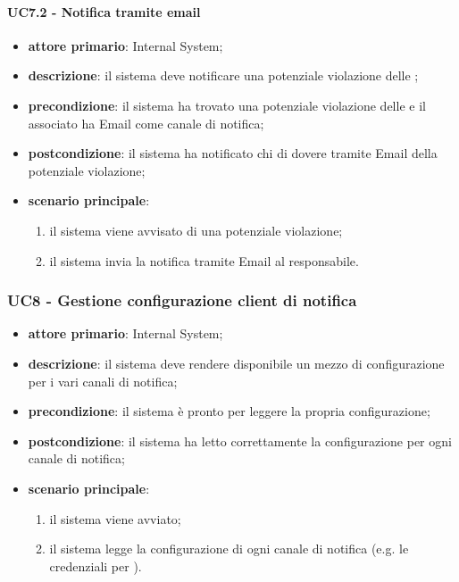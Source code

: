 \paragraph{UC7.2 -  Notifica tramite email}
\begin{itemize}
	\item \textbf{attore primario}: Internal System;
	\item \textbf{descrizione}: il sistema deve notificare una potenziale violazione delle ;
	\item \textbf{precondizione}: il sistema ha trovato una potenziale violazione delle  e il  associato ha Email come canale di notifica;
	\item \textbf{postcondizione}: il sistema ha notificato chi di dovere tramite Email  della potenziale violazione;
	\item \textbf{scenario principale}: 
	\begin{enumerate}
		\item il sistema viene avvisato di una potenziale violazione;
		\item il sistema invia la notifica tramite Email al responsabile.
	\end{enumerate}
\end{itemize}
\subsubsection{UC8 - Gestione configurazione client di notifica}
\begin{itemize}
	\item \textbf{attore primario}: Internal System;
	\item \textbf{descrizione}: il sistema deve rendere disponibile un mezzo di configurazione per i vari canali di notifica;
	\item \textbf{precondizione}: il sistema è pronto per leggere la propria configurazione;
	\item \textbf{postcondizione}: il sistema ha letto correttamente la configurazione per ogni canale di notifica;
	\item \textbf{scenario principale}: 
	\begin{enumerate}
		\item il sistema viene avviato;
		\item il sistema legge la configurazione di ogni canale di notifica (e.g. le credenziali per ).
	\end{enumerate}
\end{itemize}
